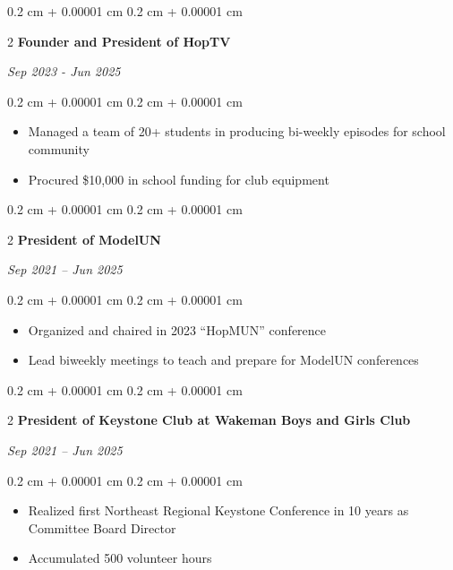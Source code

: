\documentclass[10pt, letterpaper]{article}
\newenvironment{highlights}{
    \begin{itemize}[
        topsep=0.10 cm,
        parsep=0.10 cm,
        partopsep=0pt,
        itemsep=0pt,
        leftmargin=0.4 cm + 10pt
    ]
}{
    \end{itemize}
} %
\newenvironment{onecolentry}{
    \begin{adjustwidth}{
        0.2 cm + 0.00001 cm
    }{
        0.2 cm + 0.00001 cm
    }
}{
    \end{adjustwidth}
} %
\newenvironment{twocolentry}[2][]{
    \onecolentry
    \def\secondColumn{#2}
    \setcolumnwidth{\fill, 4.5 cm}
    \begin{paracol}{2}
}{
    \switchcolumn \raggedleft \secondColumn
    \end{paracol}
    \endonecolentry
} %
\begin{document}
             \begin{twocolentry}{\textit{Sep 2023 - Jun 2025 }}{\textbf{Founder and President of HopTV}}
    \end{twocolentry}
    
    \vspace{0.10 cm}
    
    \begin{onecolentry}
        \begin{highlights}
            \item Managed a team of 20+ students in producing bi-weekly episodes for school community
            \item Procured \$10,000 in school funding for club equipment
        \end{highlights}
    \end{onecolentry}
    
    \vspace{0.2 cm}
    
   
    
    \begin{twocolentry}{\textit{Sep 2021 – Jun 2025 }}{\textbf{President of ModelUN}}
    \end{twocolentry}
    
    \vspace{0.10 cm}
    
    \begin{onecolentry}
        \begin{highlights}
            \item Organized and chaired in 2023 “HopMUN” conference
            \item Lead biweekly meetings to teach and prepare for ModelUN conferences
        \end{highlights}
    \end{onecolentry}
    
    \vspace{0.2 cm}
    
    \begin{twocolentry}{\textit{Sep 2021 – Jun 2025 }}{\textbf{President of Keystone Club at Wakeman Boys and Girls Club}}
    \end{twocolentry}
    
    \vspace{0.10 cm}
    
    \begin{onecolentry}
        \begin{highlights}
            \item Realized first Northeast Regional Keystone Conference in 10 years as Committee Board Director
            \item Accumulated 500 volunteer hours
        \end{highlights}
    \end{onecolentry}
    \vspace{0.2 cm}
    
\end{document}
